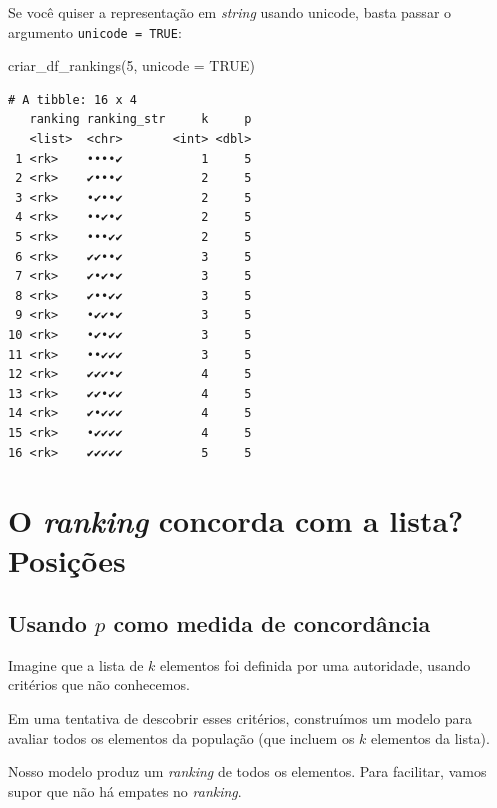\documentclass[
  letterpaper,
  DIV=11,
  numbers=noendperiod]{scrreprt}
\newenvironment{Shaded}{\begin{snugshade}}{\end{snugshade}}
\newcommand{\AttributeTok}[1]{\textcolor[rgb]{0.40,0.45,0.13}{#1}}
\newcommand{\ConstantTok}[1]{\textcolor[rgb]{0.56,0.35,0.01}{#1}}
\newcommand{\DecValTok}[1]{\textcolor[rgb]{0.68,0.00,0.00}{#1}}
\newcommand{\FunctionTok}[1]{\textcolor[rgb]{0.28,0.35,0.67}{#1}}
\newcommand{\NormalTok}[1]{\textcolor[rgb]{0.00,0.23,0.31}{#1}}
\begin{document}
Se você quiser a representação em \emph{string} usando unicode, basta
passar o argumento \texttt{unicode\ =\ TRUE}:

\begin{Shaded}
\begin{Highlighting}[]
\FunctionTok{criar\_df\_rankings}\NormalTok{(}\DecValTok{5}\NormalTok{, }\AttributeTok{unicode =} \ConstantTok{TRUE}\NormalTok{)}
\end{Highlighting}
\end{Shaded}

\begin{verbatim}
# A tibble: 16 x 4
   ranking ranking_str     k     p
   <list>  <chr>       <int> <dbl>
 1 <rk>    ••••✔           1     5
 2 <rk>    ✔•••✔           2     5
 3 <rk>    •✔••✔           2     5
 4 <rk>    ••✔•✔           2     5
 5 <rk>    •••✔✔           2     5
 6 <rk>    ✔✔••✔           3     5
 7 <rk>    ✔•✔•✔           3     5
 8 <rk>    ✔••✔✔           3     5
 9 <rk>    •✔✔•✔           3     5
10 <rk>    •✔•✔✔           3     5
11 <rk>    ••✔✔✔           3     5
12 <rk>    ✔✔✔•✔           4     5
13 <rk>    ✔✔•✔✔           4     5
14 <rk>    ✔•✔✔✔           4     5
15 <rk>    •✔✔✔✔           4     5
16 <rk>    ✔✔✔✔✔           5     5
\end{verbatim}


\chapter{\texorpdfstring{O \emph{ranking} concorda com a lista?
Posições}{O ranking concorda com a lista? Posições}}\label{o-ranking-concorda-com-a-lista-posiuxe7uxf5es}

\section{\texorpdfstring{Usando $p$ como medida de
concordância}{Usando  como medida de concordância}}\label{usando-p}

Imagine que a lista de $k$ elementos foi definida por uma autoridade,
usando critérios que não conhecemos.

Em uma tentativa de descobrir esses critérios, construímos um modelo
para avaliar todos os elementos da população (que incluem os $k$
elementos da lista).

Nosso modelo produz um \emph{ranking} de todos os elementos. Para
facilitar, vamos supor que não há empates no \emph{ranking}.
\end{document}
